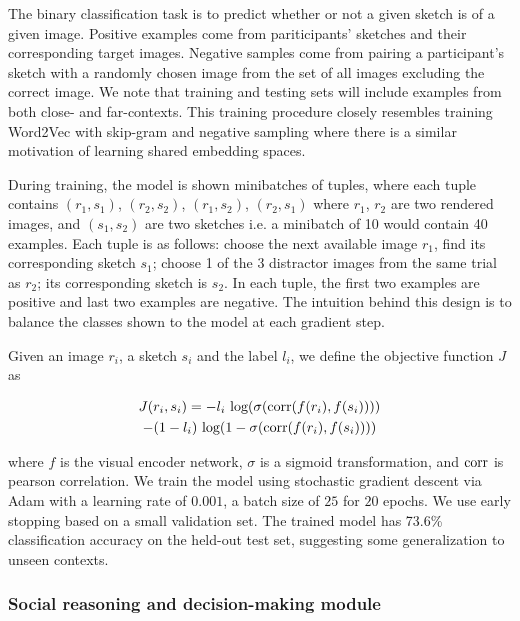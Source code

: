 \documentclass[9pt,twocolumn,twoside]{pnas-new}
\begin{document}
{The binary classification task is to predict whether or not a given sketch is of a given image. Positive examples come from pariticipants' sketches and their corresponding target images. Negative samples come from pairing a participant's sketch with a randomly chosen image from the set of all images excluding the correct image. We note that training and testing sets will include examples from both close- and far-contexts. This training procedure closely resembles training Word2Vec with skip-gram and negative sampling where there is a similar motivation of learning shared embedding spaces.

During training, the model is shown minibatches of tuples, where each tuple contains $(r_{1}, s_{1})$, $(r_{2}, s_{2})$, $(r_{1}, s_{2})$, $(r_{2}, s_{1})$ where $r_{1}$, $r_{2}$ are two rendered images, and $(s_{1}, s_{2})$ are two sketches i.e. a minibatch of 10 would contain 40 examples. Each tuple is as follows: choose the next available image $r_{1}$, find its corresponding sketch $s_{1}$; choose 1 of the 3 distractor images from the same trial as $r_{2}$; its corresponding sketch is $s_{2}$. In each tuple, the first two examples are positive and last two examples are negative. The intuition behind this design is to balance the classes shown to the model at each gradient step.

Given an image $r_{i}$, a sketch $s_{i}$ and the label $l_{i}$, we define the objective function $J$ as

\begin{multline}
    J(r_{i}, s_{i}) = -l_{i} \textup{ log}(\sigma(\textup{corr}(f(r_{i}), f(s_{i})))) \\ - (1 - l_{i}) \textup{ log}(1 - \sigma(\textup{corr}(f(r_{i}), f(s_{i}))))
\end{multline}

where $f$ is the visual encoder network, $\sigma$ is a sigmoid transformation, and $\textup{corr}$ is pearson correlation. We train the model using stochastic gradient descent via Adam with a learning rate of $0.001$, a batch size of $25$ for $20$ epochs. We use early stopping based on a small validation set. The trained model has 73.6\% classification accuracy on the held-out test set, suggesting some generalization to unseen contexts.


\subsubsection*{Social reasoning and decision-making module}

}
\end{document}
